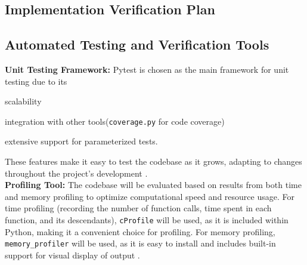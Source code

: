 \documentclass[12pt, titlepage]{article}
\begin{document}

\subsection{Implementation Verification Plan}




\subsection{Automated Testing and Verification Tools}

\textbf{Unit Testing Framework:} Pytest is chosen as the main framework for unit testing due to its \begin{inparaenum}[(i)]
                                                                                                        \item scalability
                                                                                                        \item integration with other tools(\texttt{coverage.py} for code coverage)
                                                                                                        \item extensive support for parameterized tests.
\end{inparaenum} These features make it easy to test the codebase as it grows, adapting to changes throughout the project's development \citep{pytest}.\\

\noindent\textbf{Profiling Tool:} The codebase will be evaluated based on results from both time and memory profiling to optimize computational speed and resource usage. For time profiling (recording the number of function calls, time spent in each function, and its descendants), \texttt{cProfile} will be used, as it is included within Python, making it a convenient choice for profiling. For memory profiling, \texttt{memory\_profiler} will be used, as it is easy to install and includes built-in support for visual display of output \citep{memory_profiler}.\\
\end{document}
